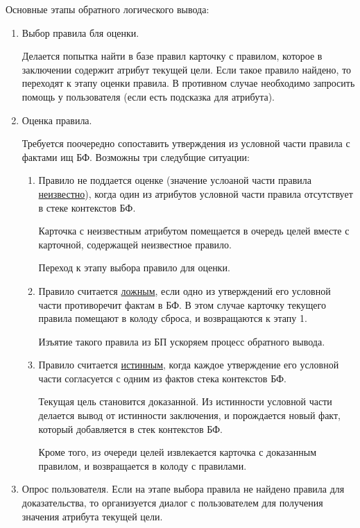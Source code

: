 Основные этапы обратного логического вывода:
\begin{enumerate}
    \item Выбор правила бля оценки.
    
    Делается попытка найти в базе правил карточку с правилом, которое в заключении содержит атрибут текущей цели. Если такое правило найдено, то переходят к этапу оценки правила. В противном случае необходимо запросить помощь у пользователя (если есть подсказка для атрибута).
    
    \item Оценка правила.
    
    Требуется поочередно сопоставить утверждения из условной части правила с фактами ищ БФ. Возможны три следубщие ситуации:
    \begin{enumerate}
		\item Правило не поддается оценке (значение услоаной части правила \underline{неизвестно}), когда один из атрибутов условной части правила отсутствует в стеке контекстов БФ.
		
		Карточка с неизвестным атрибутом помещается в очередь целей вместе с карточной, содержащей неизвестное правило.
		
		Переход к этапу выбора правило для оценки.
		
		\item Правило считается \underline{ложным}, если одно из утверждений его условной части противоречит фактам в БФ. В этом случае карточку текущего правила помещают в колоду сброса, и возвращаются к этапу 1.
		
		Изъятие такого правила из БП ускоряем процесс обратного вывода.
		
		\item Правило считается \underline{истинным}, когда каждое утверждение его условной части согласуется с одним из фактов стека контекстов БФ.
		
		Текущая цель становится доказанной. Из истинности условной части делается вывод от истинности заключения, и порождается новый факт, который добавляется в стек контекстов БФ.
		
		Кроме того, из очереди целей извлекается карточка с доказанным правилом, и возвращается в колоду с правилами.
	\end{enumerate}
	
	\item Опрос пользователя. Если на этапе выбора правила не найдено правила для доказательства, то организуется диалог с пользователем для получения значения атрибута текущей цели.
\end{enumerate}



